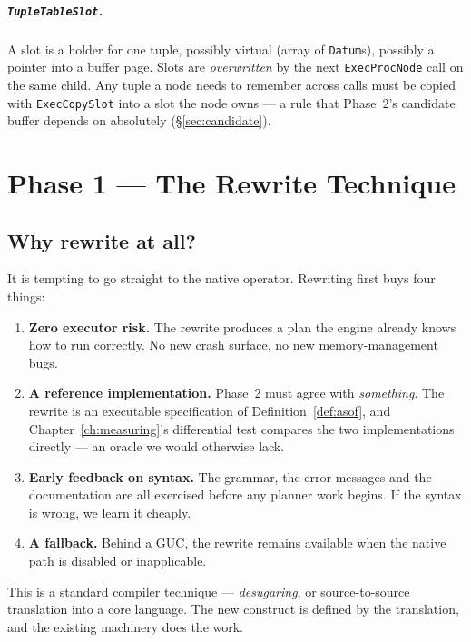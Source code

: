 \documentclass[11pt,a4paper]{report}
\theoremstyle{definition}
\theoremstyle{plain}
\newcommand{\code}[1]{\texttt{\small #1}}
\begin{document}
\paragraph{\code{TupleTableSlot}.} A slot is a holder for one tuple, possibly virtual
(array of \code{Datum}s), possibly a pointer into a buffer page. Slots are
\emph{overwritten} by the next \code{ExecProcNode} call on the same child. Any tuple a node
needs to remember across calls must be copied with \code{ExecCopySlot} into a slot the node
owns --- a rule that Phase~2's candidate buffer depends on absolutely
(\S\ref{sec:candidate}).


\chapter{Phase 1 --- The Rewrite Technique}\label{ch:phase1}

\section{Why rewrite at all?}

It is tempting to go straight to the native operator. Rewriting first buys four things:

\begin{enumerate}[leftmargin=*]
\item \textbf{Zero executor risk.} The rewrite produces a plan the engine already knows how
      to run correctly. No new crash surface, no new memory-management bugs.
\item \textbf{A reference implementation.} Phase~2 must agree with \emph{something}. The
      rewrite is an executable specification of Definition~\ref{def:asof}, and
      Chapter~\ref{ch:measuring}'s differential test compares the two implementations
      directly --- an oracle we would otherwise lack.
\item \textbf{Early feedback on syntax.} The grammar, the error messages and the
      documentation are all exercised before any planner work begins. If the syntax is
      wrong, we learn it cheaply.
\item \textbf{A fallback.} Behind a GUC, the rewrite remains available when the native path
      is disabled or inapplicable.
\end{enumerate}

This is a standard compiler technique --- \emph{desugaring}, or source-to-source
translation into a core language. The new construct is defined by the translation, and the
existing machinery does the work.
\end{document}
